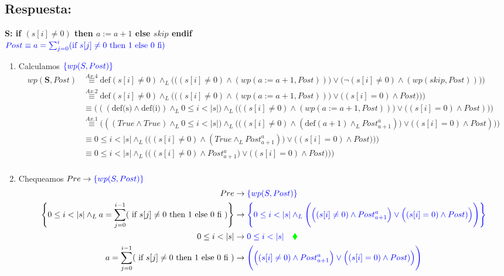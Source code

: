 \documentclass[a4paper]{article}
\begin{document}
\subsection*{Respuesta:}
\textbf{S: if $( s[i]\neq 0)$ then $a := a+1$ else $skip$ endif}\\
\hspace*{24mm}$\color{blue}Post \equiv a=\sum_{j=0}^{i}(\textrm{if }s[j] \neq 0
    \textrm{ then 1 else 0 fi})$\\
\begin{enumerate}

\item Calculamos $\color{blue}\{wp(S,Post)\}$
		\begin{align*}
		wp(\textbf{S},Post)&\stackrel{Ax.4}{\equiv} \textrm{def}(s[i]\neq 0)\wedge_L 
   					\Bigg(\Big((s[i]\neq 0)\wedge (wp(a:=a+1,Post))\Big) 
   					\vee \Big(\neg(s[i]\neq 0)\wedge (wp(skip,Post))\Big)\Bigg)\\
   			&\stackrel{Ax.2}{\equiv}  \textrm{def}(s[i]\neq 0)\wedge_L 
   				\Bigg(\Big((s[i]\neq 0)\wedge (wp(a:=a+1,Post))\Big) 
   				\vee \Big((s[i] = 0)\wedge Post)\Big)\Bigg)\\
   			&\equiv \Big(((\textrm{def(s)}\wedge
				 \textrm{def(i)})\wedge_L 0\leq i<|s|\Big)\wedge_L 
   				\Bigg(\Big((s[i]\neq 0)\wedge (wp(a:=a+1,Post))\Big) 
   				\vee \Big((s[i] = 0)\wedge Post)\Big)\Bigg)\\  
   			&\stackrel{Ax.1}{\equiv} \Big(((True\wedge
				 True)\wedge_L 0\leq i<|s|\Big)\wedge_L 
   				\Bigg(\Big((s[i]\neq 0)\wedge (\textrm{def}(a+1)\wedge_L
   					Post_{a+1}^{a})\Big) \vee \Big((s[i] = 0)\wedge Post)\Big)\Bigg)\\
   			&\equiv  0\leq i<|s|\wedge_L 
   				\Bigg(\Big((s[i]\neq 0)\wedge (True \wedge_L
   					Post_{a+1}^{a})\Big) \vee \Big((s[i] = 0)\wedge Post)\Big)\Bigg)\\
   			&\equiv  0\leq i<|s|\wedge_L 
   				\Bigg(\Big((s[i]\neq 0)\wedge
   					Post_{a+1}^{a}\Big) \vee \Big((s[i] = 0)\wedge Post)\Big)\Bigg)\\ 									
		\end{align*}
\item Chequeamos $Pre \rightarrow \color{blue}\{wp(S,Post)\}$		
		\begin{align*}
		Pre &\rightarrow \color{blue}\{wp(S,Post)\}\\
		\Bigg\{0 \leq i < |s| \wedge_L a=\sum_{j=0}^{i-1}(\textrm{ if }s[j] \neq 0 
    \textrm{ then 1 else 0 fi })\Bigg\} &\rightarrow  \color{blue}\Bigg\{0\leq i<|s|\wedge_L 
   			\Bigg(\Big((s[i]\neq 0)\wedge
   				Post_{a+1}^{a}\Big) \vee \Big((s[i] = 0)\wedge Post)\Big)\Bigg)\Bigg\}\\
   			0 \leq i < |s| &\rightarrow \color{blue} 0\leq i<|s| \quad\color{green}\blacklozenge\\
   			a=\sum_{j=0}^{i-1}(\textrm{ if }s[j] \neq 0 
    \textrm{ then 1 else 0 fi }) &\rightarrow \color{blue} \Bigg(\Big((s[i]\neq 0)\wedge
   				Post_{a+1}^{a}\Big) \vee \Big((s[i] = 0)\wedge Post)\Big)\Bigg)\\
   		\end{align*}


\end{enumerate}
\end{document}
